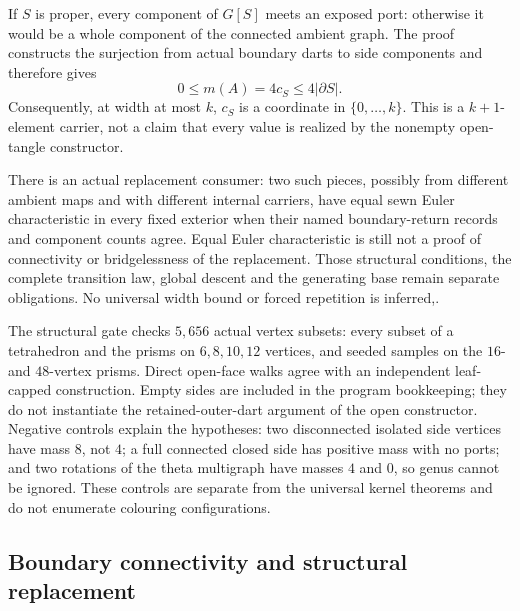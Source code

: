 If $S$ is proper, every component of $G[S]$ meets an exposed port:
otherwise it would be a whole component of the connected ambient graph.
The proof constructs the surjection from actual boundary darts to side
components and therefore gives
\[
       0\le m(A)=4c_S\le4|\partial S|.
\]
Consequently, at width at most $k$, $c_S$ is a coordinate in
$\{0,\ldots,k\}$. This is a $k+1$-element carrier, not a claim that every
value is realized by the nonempty open-tangle constructor.

There is an actual replacement consumer: two such pieces, possibly from
different ambient maps and with different internal carriers, have equal
sewn Euler characteristic in every fixed exterior when their named
boundary-return records and component counts agree.
Equal Euler characteristic is still not a proof of connectivity or
bridgelessness of the replacement. Those structural conditions, the
complete transition law, global descent and the generating base remain
separate obligations. No universal width bound or forced repetition is
inferred,.

The structural gate checks $5{,}656$ actual vertex subsets: every subset
of a tetrahedron and the prisms on $6,8,10,12$ vertices, and seeded samples
on the $16$- and $48$-vertex prisms. Direct open-face walks agree with an
independent leaf-capped construction. Empty sides are included in the
program bookkeeping; they do not instantiate the retained-outer-dart
argument of the open constructor. Negative controls explain the
hypotheses: two disconnected isolated side vertices have mass $8$, not
$4$; a full connected closed side has positive mass with no ports; and
two rotations of the theta multigraph have masses $4$ and $0$, so genus
cannot be ignored. These controls are separate from the universal kernel
theorems and do not enumerate colouring configurations.

\subsection{Boundary connectivity and structural replacement}
\label{sec:boundary-connectivity-replacement}

